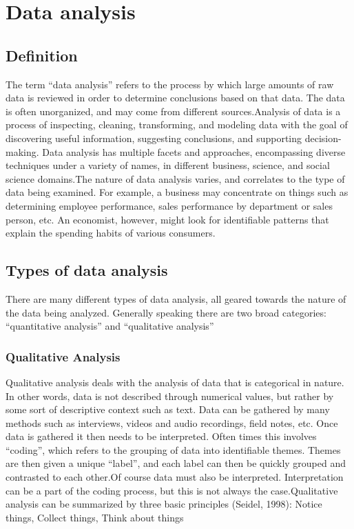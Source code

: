 \documentclass[a4paper,12pt,oneside]{report}
\begin{document}
{\section{Data analysis}
\subsection{Definition}
{      The term “data analysis” refers to the process by which large amounts of raw data is reviewed in order to determine conclusions based on that data. The data is often unorganized, and may come from different sources.Analysis of data is a process of inspecting, cleaning, transforming, and modeling data with the goal of discovering useful information, suggesting conclusions, and supporting decision-making. Data analysis has multiple facets and approaches, encompassing diverse techniques under a variety of names, in different business, science, and social science domains.The nature of data analysis varies, and correlates to the type of data being examined. For example, a business may concentrate on things such as determining employee performance, sales performance by department or sales person, etc. An economist, however, might look for identifiable patterns that explain the spending habits of various consumers.}
\subsection{Types of data analysis }
{     There are many different types of data analysis, all geared towards the nature of the data being analyzed. Generally speaking there are two broad categories: “quantitative analysis” and “qualitative analysis”}
\subsubsection{Qualitative Analysis}
{    Qualitative analysis deals with the analysis of data that is categorical in nature. In other words, data is not described through numerical values, but rather by some sort of descriptive context such as text. Data can be gathered by many methods such as interviews, videos and audio recordings, field notes, etc.
Once data is gathered it then needs to be interpreted. Often times this involves “coding”, which refers to the grouping of data into identifiable themes. Themes are then given a unique “label”, and each label can then be quickly grouped and contrasted to each other.Of course data must also be interpreted. Interpretation can be a part of the coding process, but this is not always the case.Qualitative analysis can be summarized by three basic principles (Seidel, 1998):
Notice things, Collect things, Think about things}
}
\end{document}
